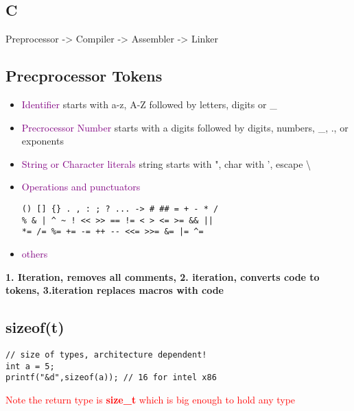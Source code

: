 \documentclass[main.tex,fontsize=8pt,paper=a4,paper=landscape,DIV=calc,]{scrartcl}
\begin{document}
\begin{multicols*}{4}
\lstset{
    language=c,
    style=code,
}
\section{C}
Preprocessor -> Compiler -> Assembler -> Linker

\subsection{Precprocessor Tokens}
\begin{itemize}
\item \textcolor{purple}{Identifier}\newline
starts with a-z, A-Z followed by letters, digits or \_
\item \textcolor{purple}{Precrocessor Number}\newline
  starts with a digits followed by digits, numbers, \_, ., or exponents
\item \textcolor{purple}{String or Character literals}\newline
  string starts with ", char with ', escape \textbackslash 
\item \textcolor{purple}{Operations and punctuators}\newline
\vspace{-2.5mm}
\begin{lstlisting}
() [] {} . , : ; ? ... -> # ## = + - * /
% & | ^ ~ ! << >> == != < > <= >= && ||
*= /= %= += -= ++ -- <<= >>= &= |= ^=
\end{lstlisting}
\vspace{2mm}
\item \textcolor{purple}{others}
\end{itemize} 

\textbf{1. Iteration, removes all comments, 2. iteration, converts code to tokens, 3.iteration replaces macros with code}

\subsection{sizeof(t)}
\vspace{-2.5mm}
\begin{lstlisting}
// size of types, architecture dependent!
int a = 5;
printf("&d",sizeof(a)); // 16 for intel x86
\end{lstlisting}
\vspace{2mm}
\textcolor{red}{Note the return type is \textbf{size\_t} which is big enough to hold any type}


\end{multicols*}
\end{document}
